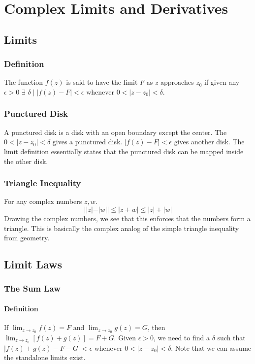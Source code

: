 \documentclass[../main.tex]{subfiles}
\begin{document}
\chapter{Complex Limits and Derivatives}
\section{Limits}
    \subsection{Definition}
        The function $f(z)$ is said to have the limit $F$ as $z$ approaches $z_{0}$ if given any $\epsilon>0$
        $\exists$ $\delta\mid |f(z)-F|<\epsilon$ whenever $0<|z-z_{0}|<\delta$.
    
    \subsection{Punctured Disk}
        A punctured disk is a disk with an open boundary except the center.
        The $0<|z-z_{0}|<\delta$ gives a punctured disk. $|f(z)-F|<\epsilon$ gives another disk.
        The limit definition essentially states that the punctured disk can be mapped inside the other disk.
    
    \subsection{Triangle Inequality}
        For any complex numbers $z, w$.
            $$||z|-|w||\leq |z+w| \leq |z| + |w|$$
        Drawing the complex numbers, we see that this enforces that the numbers form a triangle. This is basically
        the complex analog of the simple triangle inequality from geometry.

\section{Limit Laws}
    \subsection{The Sum Law}
        \subsubsection{Definition}
            If $\lim_{z\rightarrow z_{0}}f(z)=F$ and $\lim_{z\rightarrow z_{0}}g(z)=G$, then $\lim_{z\rightarrow z_{0}}\left[f(z)+g(z)\right]=F+G$.
            Given $\epsilon >0$, we need to find a $\delta$ such that $|f(z)+g(z)-F-G|<\epsilon$ whenever $0<|z-z_{0}|<\delta$. Note that we can assume the 
            standalone limits exist.
\end{document}
